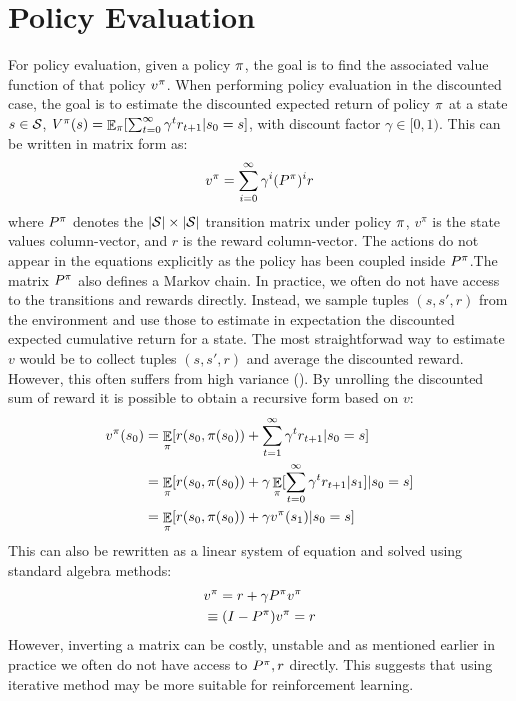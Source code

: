 \section{Policy Evaluation}
For policy evaluation,  given a policy $\pi$, the goal is to find the associated value function of that policy $v^{\pi}$. 
When performing policy evaluation in the discounted case, the goal is to estimate the discounted expected return of policy $\pi$ at a state $s\in\mathcal{S}$,  $V^{\pi}(s) = \mathop{\mathbb{E}}_{\pi}[\sum_{t=0}^{\infty} \gamma^t r_{t+1} | s_0 = s]$, with discount factor $\gamma \in [0,1)$. This can be written in matrix form as:
\begin{equation}
     v^{\pi} = \sum_{i=0}^{\infty} \gamma^i (P^{\pi})^i r
\end{equation}
where $P^{\pi}$ denotes the $|\mathcal{S}|\times |\mathcal{S}|$ transition matrix under policy $\pi$, $v^\pi$ is the state values column-vector, and $r$ is the reward column-vector. The actions do not appear in the equations explicitly as the policy has been coupled inside $P^{\pi}$.The matrix $P^{\pi}$ also defines a Markov chain.
In practice, we often do not have  access to the transitions and rewards directly. Instead, we sample tuples $(s,s',r)$ from the environment and use those to estimate in expectation the discounted expected cumulative return for a state.
The most straightforwad way to estimate $v$ would be to collect tuples $(s,s',r)$  and average the discounted reward. However, this often suffers from high variance (\citep{kearns2000bias}). By unrolling the discounted sum of reward it is possible to obtain a recursive form based on $v$:
\begin{equation}
\label{equ:bellman}
\begin{split}
    v^{\pi}(s_0) &=  \mathop{\mathbb{E}}_{\pi}[r (s_0,\pi(s_0)) + \sum_{t=1}^{\infty} \gamma^t r_{t+1} | s_0 = s] \\
    &=  \mathop{\mathbb{E}}_{\pi}[r (s_0,\pi(s_0)) + \gamma \mathop{\mathbb{E}}_{\pi}[\sum_{t=0}^{\infty} \gamma^t r_{t+1}|s_1] | s_0 = s]\\
    &= \mathop{\mathbb{E}}_{\pi}[r (s_0,\pi(s_0)) + \gamma v^{\pi}(s_1) | s_0 = s] \\
\end{split}
\end{equation}
This can also be rewritten as a linear system of equation and solved using standard algebra methods:
\begin{equation}
\label{eq:fixed_point}
\begin{split}
    & v^{\pi} = r + \gamma P^{\pi}v^{\pi} \\
    &\equiv (I-P^{\pi})v^{\pi} = r
\end{split}
\end{equation}
However, inverting a matrix can be costly, unstable and as mentioned earlier in practice we often do not have access to $P^{\pi},r$ directly. This suggests that using iterative method may be more suitable for reinforcement learning.

